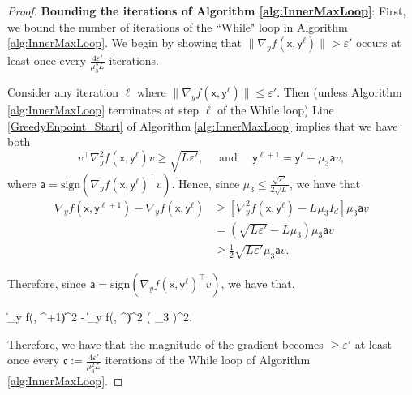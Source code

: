 \documentclass[11pt,letterpaper]{article}
\renewcommand{\epsilon}{\varepsilon}
\def \be{\begin{equs}}
\def \ee{\end{equs}}
\newcommand{\aell}{\ell}
\begin{document}
\begin{proof}

\textbf{Bounding the iterations of Algorithm \ref{alg:InnerMaxLoop}}:
First, we bound the number of iterations of the  ``While" loop in Algorithm \ref{alg:InnerMaxLoop}. 
%
We begin by showing that $\| \nabla_y f(\mathsf{x}, \mathsf{y}^{\aell})\| > \epsilon'$ occurs at least once every $\frac{4 \epsilon'}{\mu_3^2 L_{}}$ iterations.

Consider any iteration $\ell$ where $\| \nabla_y f(\mathsf{x}, \mathsf{y}^{\aell})\| \leq \epsilon'$.  Then (unless Algorithm \ref{alg:InnerMaxLoop} terminates at step $\aell$ of the While loop) Line \ref{GreedyEnpoint_Start} of Algorithm \ref{alg:InnerMaxLoop} implies that we have both
\begin{equation*}
v^\top \nabla^2_{{y}}f(\mathsf{x}, \mathsf{y}^{\aell}) v \geq \sqrt{L_{} \epsilon'},
%
\quad \textrm{ and } \quad
 \mathsf{y}^{\aell+1} = \mathsf{y}^\ell + \mu_3 \mathsf{a} v,
\end{equation*}
 where $\mathsf{a} = \mathrm{sign}(\nabla_yf(\mathsf{x},\mathsf{y}^{\aell})^\top v)$.
\noindent 
  Hence, since $\mu_3 \leq \frac{\sqrt{\epsilon'}}{2\sqrt{L_{}}}$, we have that
\begin{align*}
\nabla_y f(\mathsf{x}, \mathsf{y}^{\aell+1}) - \nabla_y f(\mathsf{x}, \mathsf{y}^{\aell}) &\geq  [\nabla_y^2 f(\mathsf{x}, \mathsf{y}^{\aell}) -L_{} \mu_3 I_d] \mu_3 \mathsf{a} v\\
%
&= (\sqrt{L_{} \epsilon'} - L_{} \mu_3) \mu_3 \mathsf{a} v\\
%
&\geq  \frac{1}{2}\sqrt{L_{} \epsilon'} \mu_3 \mathsf{a} v.
\end{align*}
%

\noindent
Therefore, since $\mathsf{a} = \mathrm{sign}(\nabla_yf(\mathsf{x},\mathsf{y}^{\aell})^\top v)$, we have that,
\be \label{eq:a1}
\|\nabla_y f(, ^{\aell+1})\|^2 - \|\nabla_y f(, ^{\aell})\|^2 \geq  \left(\sqrt{L_{} \epsilon'} \mu_3 \right)^2.
\ee
Therefore, we have that the magnitude of the gradient becomes $\geq \epsilon'$ at least once every $\mathfrak{c} := \frac{4 \epsilon'}{\mu_3^2 L_{}}$ iterations of the While loop of Algorithm \ref{alg:InnerMaxLoop}. 


\end{proof}
\end{document}
